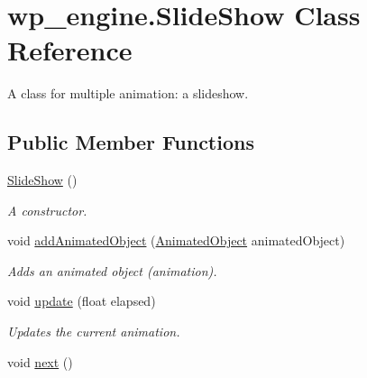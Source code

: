 \hypertarget{classwp__engine_1_1_slide_show}{\section{wp\-\_\-engine.\-Slide\-Show Class Reference}
\label{classwp__engine_1_1_slide_show}
}


A class for multiple animation\-: a slideshow.  


\subsection*{Public Member Functions}
\begin{DoxyCompactItemize}
\item 
\hyperlink{classwp__engine_1_1_slide_show_afc5fccb2413a851f53ce4fef36c7e265}{Slide\-Show} ()
\begin{DoxyCompactList}\small\item\em A constructor. \end{DoxyCompactList}\item 
void \hyperlink{classwp__engine_1_1_slide_show_a0dd7f71b3beabc241f1b537bb3e7e5e7}{add\-Animated\-Object} (\hyperlink{classwp__engine_1_1_animated_object}{Animated\-Object} animated\-Object)
\begin{DoxyCompactList}\small\item\em Adds an animated object (animation). \end{DoxyCompactList}\item 
void \hyperlink{classwp__engine_1_1_slide_show_a77b840d961b07ca4c123ecfb1179f8f2}{update} (float elapsed)
\begin{DoxyCompactList}\small\item\em Updates the current animation. \end{DoxyCompactList}\item 
\hypertarget{classwp__engine_1_1_slide_show_a030f369d8cd2de1fdbe1198e18f77bd2}{void \hyperlink{classwp__engine_1_1_slide_show_a030f369d8cd2de1fdbe1198e18f77bd2}{next} ()}\label{classwp__engine_1_1_slide_show_a030f369d8cd2de1fdbe1198e18f77bd2}


\end{DoxyCompactItemize}
